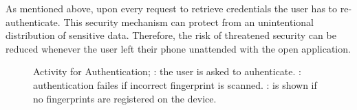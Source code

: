 As mentioned above, upon every request to retrieve credentials the user has to re-authenticate. This security mechanism can protect from an unintentional distribution of sensitive data. Therefore, the risk of threatened security can be reduced whenever the user left their phone unattended with the open application. \\

\begin{figure}[!htb]
\centering
{}
\qquad
{}
\qquad
{}
\caption[Activity for Authentication]{Activity for Authentication; \protect{}: the user is asked to auhenticate. \protect{}: authentication failes if incorrect fingerprint is scanned. \protect{}: is shown if no fingerprints are registered on the device.}
\label{fig:authentication}
\end{figure}

